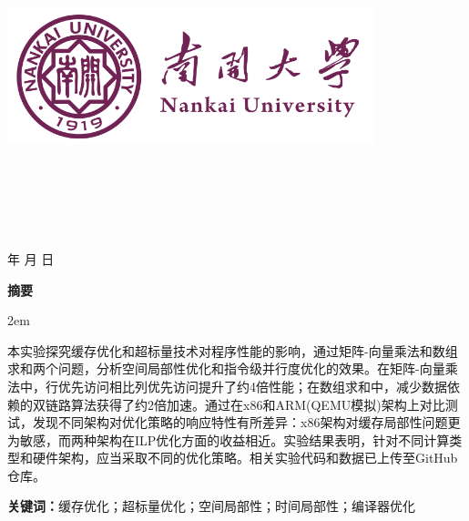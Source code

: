 \documentclass[a4paper,colorlinks=true,linkcolor=blue,urlcolor=blue,citecolor=green,bookmarks=true]{article}
\newenvironment{cnabstract}{
    \par\small
    \noindent\mbox{}\par\vspace{-\baselineskip}
    \par\songti\parindent 2em
    }
    {\par\vspace{1em}}
\begin{document}
\renewcommand{\contentsname}{目录}
\renewcommand{\appendixname}{附录}
\renewcommand{\appendixpagename}{附录}
\renewcommand{\refname}{参考文献} 
\renewcommand{\figurename}{图}
\renewcommand{\tablename}{表}
\renewcommand{\abstractname}{摘要}
\renewcommand{\today}{\number\year 年 \number\month 月 \number\day 日}

\renewcommand {\thefigure}{\thesection{}.\arabic{figure}}%
\renewcommand{\figurename}{图}
\renewcommand{\contentsname}{目录}  

\begin{titlepage}
    \begin{center}
    \includegraphics[width=0.8\textwidth]{NKU.png}\\[1cm]
    \vspace{20mm}
		\textbf{\huge\textbf{}}\\[0.5cm]
		\textbf{\huge{}}\\[2.3cm]
		\textbf{\Huge\textbf{}}

		\vspace{\fill}
    
    \centering
    \textsc{\LARGE {}}\\[0.5cm]
    \textsc{\LARGE {}}\\[0.5cm]
    \textsc{\LARGE {}}\\[0.5cm]
    
    \vfill
    {\Large \today}
    \end{center}
\end{titlepage}

\clearpage
{}
\begin{center}{\songti\bfseries{摘\quad 要}}\end{center}\par\vspace{0.5em}
\begin{cnabstract}
本实验探究缓存优化和超标量技术对程序性能的影响，通过矩阵-向量乘法和数组求和两个问题，分析空间局部性优化和指令级并行度优化的效果。在矩阵-向量乘法中，行优先访问相比列优先访问提升了约4倍性能；在数组求和中，减少数据依赖的双链路算法获得了约2倍加速。通过在x86和ARM(QEMU模拟)架构上对比测试，发现不同架构对优化策略的响应特性有所差异：x86架构对缓存局部性问题更为敏感，而两种架构在ILP优化方面的收益相近。实验结果表明，针对不同计算类型和硬件架构，应当采取不同的优化策略。相关实验代码和数据已上传至GitHub仓库。

\vspace{1em}
\noindent\textbf{关键词：}缓存优化；超标量优化；空间局部性；时间局部性；编译器优化
\end{cnabstract}
\end{document}
